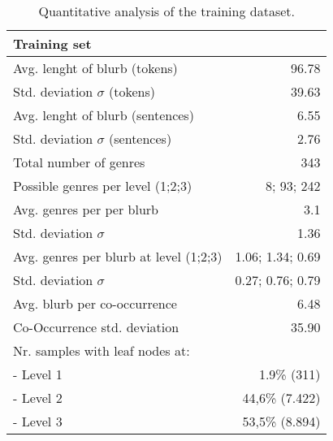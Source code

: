 \documentclass[11pt,a4paper]{article}
\begin{document}
\begin{table}
\small
\begin{center}
\begin{tabular}{|l|r|}
\hline\centering\textbf{Training set}  &                        \\
\hline
Avg. lenght of blurb (tokens)              &  96.78             \\
Std. deviation $\sigma$ (tokens)           &  39.63             \\
Avg. lenght of blurb (sentences)           &  6.55              \\
Std. deviation $\sigma$ (sentences)        &  2.76              \\
\hline
Total number of genres                     &  343               \\
Possible genres per level (1;2;3)          &  8; 93; 242        \\
Avg. genres per per blurb                  &  3.1               \\
Std. deviation $\sigma$                    &  1.36              \\
Avg. genres per blurb at level (1;2;3)     &  1.06; 1.34; 0.69  \\
Std. deviation $\sigma$                    &  0.27; 0.76; 0.79  \\
\hline
Avg. blurb per co-occurrence               &  6.48              \\
Co-Occurrence std. deviation               & 35.90              \\
\hline
Nr. samples with leaf nodes at:            &                    \\
 - Level 1                                 & 1.9\% (311)        \\
 - Level 2                                 & 44,6\% (7.422)     \\
 - Level 3                                 & 53,5\% (8.894)     \\
\hline
\end{tabular}
\end{center}
\caption{\label{quantitivy-analysis-train}Quantitative analysis of the training dataset.}
\end{table}
\end{document}
